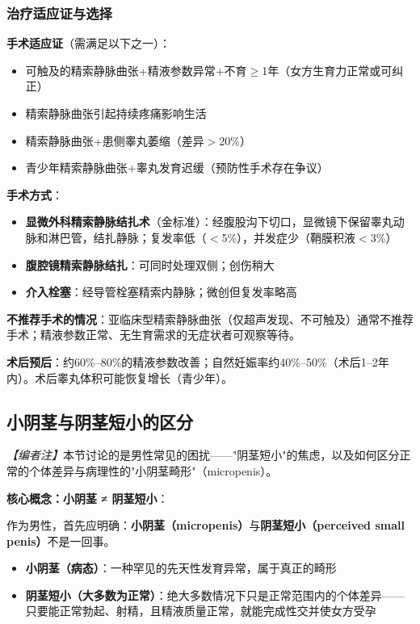 \subsubsection{治疗适应证与选择}

\textbf{手术适应证}（需满足以下之一）：
\begin{itemize}[leftmargin=2cm]
	\item 可触及的精索静脉曲张+精液参数异常+不育$\ge$1年（女方生育力正常或可纠正）
	\item 精索静脉曲张引起持续疼痛影响生活
	\item 精索静脉曲张+患侧睾丸萎缩（差异$>$20\%）
	\item 青少年精索静脉曲张+睾丸发育迟缓（预防性手术存在争议）
\end{itemize}

\textbf{手术方式}：
\begin{itemize}[leftmargin=2cm]
	\item \textbf{显微外科精索静脉结扎术}（金标准）：经腹股沟下切口，显微镜下保留睾丸动脉和淋巴管，结扎静脉；复发率低（$<$5\%），并发症少（鞘膜积液$<$3\%）
	\item \textbf{腹腔镜精索静脉结扎}：可同时处理双侧；创伤稍大
	\item \textbf{介入栓塞}：经导管栓塞精索内静脉；微创但复发率略高
\end{itemize}

\textbf{不推荐手术的情况}：亚临床型精索静脉曲张（仅超声发现、不可触及）通常不推荐手术；精液参数正常、无生育需求的无症状者可观察等待。

\textbf{术后预后}：约60\%--80\%的精液参数改善；自然妊娠率约40\%--50\%（术后1--2年内）。术后睾丸体积可能恢复增长（青少年）。

\subsection{小阴茎与阴茎短小的区分}

\noindent\textit{【编者注】}本节讨论的是男性常见的困扰——"阴茎短小"的焦虑，以及如何区分正常的个体差异与病理性的"小阴茎畸形"（micropenis）。

\vspace{0.5em}
\noindent\textbf{核心概念：小阴茎 ≠ 阴茎短小}：

作为男性，首先应明确：\textbf{小阴茎（micropenis）}与\textbf{阴茎短小（perceived small penis）}不是一回事。

\begin{itemize}
	\item \textbf{小阴茎（病态）}：一种罕见的先天性发育异常，属于真正的畸形
	\item \textbf{阴茎短小（大多数为正常）}：绝大多数情况下只是正常范围内的个体差异——只要能正常勃起、射精，且精液质量正常，就能完成性交并使女方受孕
\end{itemize}

